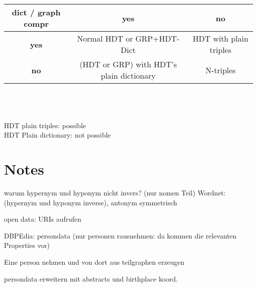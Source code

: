 \documentclass[a4paper]{scrartcl}
\begin{document}
\begin{tabular}{|c|c|c|}
	\hline 
	\textbf{dict  / graph compr }& \textbf{yes} & \textbf{no} \\ 
	\hline 
	\textbf{yes} & Normal HDT or GRP+HDT-Dict & HDT with plain triples \\ 
	\hline 
	\textbf{no} & (HDT or GRP) with HDT's plain dictionary  & N-triples \\ 
	\hline 
\end{tabular} 
\\\\\\HDT plain triples: possible\\
HDT Plain dictionary: not possible

\section{Notes}

warum hypernym und hyponym nicht invers? (nur nomen Teil)
Wordnet: (hypernym und hyponym inverse), antonym symmetrisch

open data: URIs aufrufen



DBPEdia: persondata (nur personen rausnehmen: da kommen die relevanten Properties vor)

Eine person nehmen und von dort aus teilgraphen erzeugen

persondata erweitern mit abstracts und birthplace koord.
\end{document}
